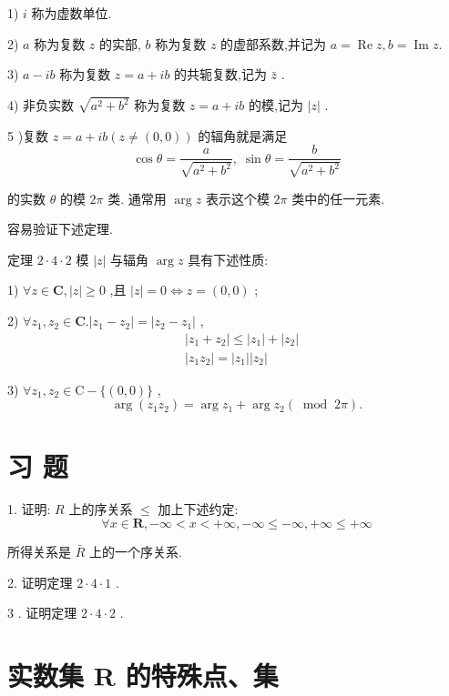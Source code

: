 1) $i$ 称为虚数单位.

2) $a$ 称为复数 $z$ 的实部, $b$ 称为复数 $z$ 的虚部系数,并记为 $a = \operatorname{Re}z,b = \operatorname{Im}z.$

3) $a - {ib}$ 称为复数 $z = a + {ib}$ 的共轭复数,记为 $\bar{z}$ .

4) 非负实数 $\sqrt{{a}^{2} + {b}^{2}}$ 称为复数 $z = a + {ib}$ 的模,记为 $\left| z\right|$ .

5 )复数 $z = a + {ib}\left( {z \neq  \left( {0,0}\right) }\right)$ 的辐角就是满足
$$\cos \theta  = \frac{a}{\sqrt{{a}^{2} + {b}^{2}}},\;\sin \theta  = \frac{b}{\sqrt{{a}^{2} + {b}^{2}}}$$

的实数 $\theta$ 的模 ${2\pi }$ 类. 通常用 $\arg z$ 表示这个模 ${2\pi }$ 类中的任一元素.

容易验证下述定理.

定理 $2 \cdot  4 \cdot  2$ 模 $\left| z\right|$ 与辐角 $\arg z$ 具有下述性质:

1) $\forall z \in  \mathbf{C},\left| z\right|  \geq  0$ ,且 $\left| z\right|  = 0 \Leftrightarrow  z = \left( {0,0}\right)$ ;

2) $\forall {z}_{1},{z}_{2} \in  \mathbf{C}.\left| {{z}_{1} - {z}_{2}}\right|  = \left| {{z}_{2} - {z}_{1}}\right|$ ,
\begin{align*}
	&\left| {{z}_{1} + {z}_{2}}\right|  \leq  \left| {z}_{1}\right|  + \left| {z}_{2}\right|\\
	&\left| {{z}_{1}{z}_{2}}\right|  = \left| {z}_{1}\right| \left| {z}_{2}\right|
\end{align*}

3) $\forall {z}_{1},{z}_{2} \in  \mathrm{C} - \{ \left( {0,0}\right) \}$ ,
$$\arg \left( {{z}_{1}{z}_{2}}\right)  = \arg {z}_{1} + \arg {z}_{2}\left( {{\;\operatorname{mod}\;2}\pi }\right) .$$

\section*{习 题}

1. 证明: $R$ 上的序关系 $\leq$ 加上下述约定:
$$\forall x \in  \mathbf{R}, - \infty  < x <  + \infty , - \infty  \leq   - \infty , + \infty  \leq   + \infty$$

所得关系是 $\bar{R}$ 上的一个序关系.

2. 证明定理 $2 \cdot  4 \cdot  1$ .

3 . 证明定理 $2 \cdot  4 \cdot  2$ .

\section{实数集 $\mathbf{R}$ 的特殊点、集}

